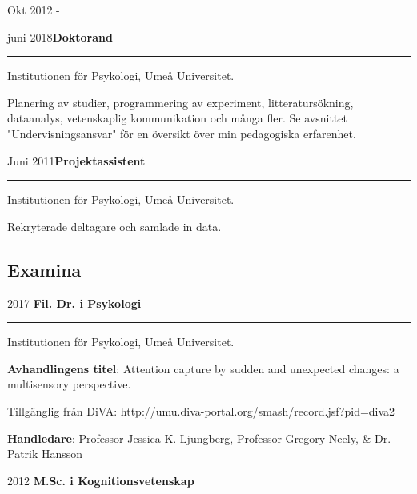\documentclass[]{article}
\begin{document}
Okt 2012 -

juni 2018\hspace{0.75cm}\textbf{Doktorand}\vspace{1mm}

\hrule
\begin{changemargin}{2.3cm}{2.4cm}

Institutionen för Psykologi, Umeå Universitet.

Planering av studier, programmering av experiment, litteratursökning, dataanalys, vetenskaplig kommunikation och många fler. Se avsnittet "Undervisningsansvar" för en översikt över min pedagogiska erfarenhet.

\end{changemargin}

Juni 2011\hspace{0.75cm}\textbf{Projektassistent}\vspace{1mm}

\hrule
\begin{changemargin}{2.3cm}{2.4cm}

Institutionen för Psykologi, Umeå Universitet.

Rekryterade deltagare och samlade in data.

\end{changemargin}

\hypertarget{examina}{%
\subsection{Examina}\label{examina}}

2017 \hspace{1.5cm} \textbf{Fil. Dr. i Psykologi}\vspace{1mm}

\hrule

\begin{changemargin}{2.3cm}{2.4cm}

Institutionen för Psykologi, Umeå Universitet.

\textbf{Avhandlingens titel}: Attention capture by sudden and unexpected changes: a multisensory perspective. 

Tillgänglig från DiVA: \sloppy http://umu.diva-portal.org/smash/record.jsf?pid=diva2%

\textbf{Handledare}: Professor Jessica K. Ljungberg, Professor Gregory Neely, \& Dr. Patrik Hansson
\end{changemargin}

2012 \hspace{1.5cm}\textbf{M.Sc. i Kognitionsvetenskap}\vspace{1mm}
\end{document}
